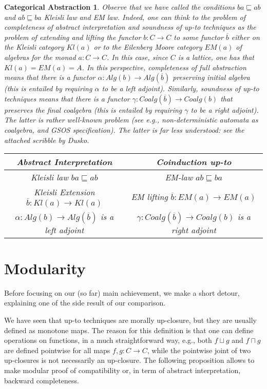 \documentclass[smallcondensed,envcountsect,envcountsame]{svjour3}     %
\newtheorem{CA}[theorem]{Categorical Abstraction}
\begin{document}
\begin{CA}
Observe that we have called the conditions $ba \sqsubseteq ab$ and $ab \sqsubseteq ba$ Kleisli law and EM law. Indeed, one can think to the problem of completeness of abstract interpretation and soundness of up-to techniques as the problem of \emph{extending} and \emph{lifting} the functor $b\colon C \to C$ to some functor $\overline{b}$ either on the Kleisli category $Kl(a)$ or to the Eilenberg Moore category $EM(a)$ of algebras for the monad $a\colon C \to C$. In this case, since $C$ is a lattice, one has that $Kl(a) = EM(a) =A$. In this perspective, completeness of full abstraction means that there is a functor $\alpha \colon Alg(b) \to Alg(\overline{b})$ preserving initial algebra (this is entailed by requiring $\alpha$ to be a left adjoint). Similarly, soundness of up-to techniques means that there is a functor $\gamma \colon Coalg(\overline{b}) \to Coalg (b)$ that preserves the final coalgebra (this is entailed by requiring $\gamma$ to be a right adjoint). The latter is rather well-known problem (see e.g., non-deterministic automata as coalgebra, and GSOS specification). The latter is far less understood: see the attached scribble by Dusko. 

\medskip

\begin{tabular}{cc}
Abstract Interpretation & Coinduction up-to\\
\hline
Kleisli law $ba \sqsubseteq ab$ & EM-law $ab \sqsubseteq ba$  \\
Kleisli Extension $\overline{b} \colon Kl(a) \to Kl(a)$ & EM lifting $\overline{b} \colon EM(a) \to EM(a)$\\
$\alpha \colon Alg(b) \to Alg(\overline{b})$ is a left adjoint & $\gamma \colon Coalg(\overline{b}) \to Coalg (b)$ is a right adjoint \\
\end{tabular}

\end{CA}


\section{Modularity}\label{sec:mod}
%
Before focusing on our (so far) main achievement, we make a short detour, explaining one of the side result of our comparison.

We have seen that up-to techniques are morally up-closure, but they are usually defined as monotone maps. The reason for this definition is that one can define operations on functions, in a much straightforward way, e.g., both $f\sqcup g$ and $f\sqcap g$ are defined pointwise for all maps $f,g\colon C \to C$, while the pointwise joint of two up-closures is not necessarily an up-closure. The following proposition allows to make modular proof of compatibility or, in term of abstract interpretation, backward completeness.
\end{document}
